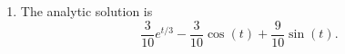 \begin{example}
\begin{enumerate}
\[\begin{array}{ccc|c}
                    1 & 1 & 0 & 0 \\ 
                    0 & 1 & 1/3 & 0 \\ 
                    0 & 1/3 & -1 & -1 \end{array} \right) \to 
                \left( \begin{array}{ccc|c}  
                    1 & 0 & -1/3 & 0 \\ 
                    0 & 1 & 1/3 & 0 \\ 
                    0 & 0 & -10/9 & -1 \end{array} \right) \to 
                \left( \begin{array}{ccc|c}  
                    1 & 0 & 0 & 3/10 \\ 
                    0 & 1 & 0 & -3/10 \\ 
                    0 & 0 & 1 & 9/10 \end{array} \right).
            \]
        \item The analytic solution is
            \[ \frac{3}{10} e^{t/3} - \frac{3}{10} \cos(t) + \frac{9}{10} \sin(t). \]
    \end{enumerate}
\end{example}



